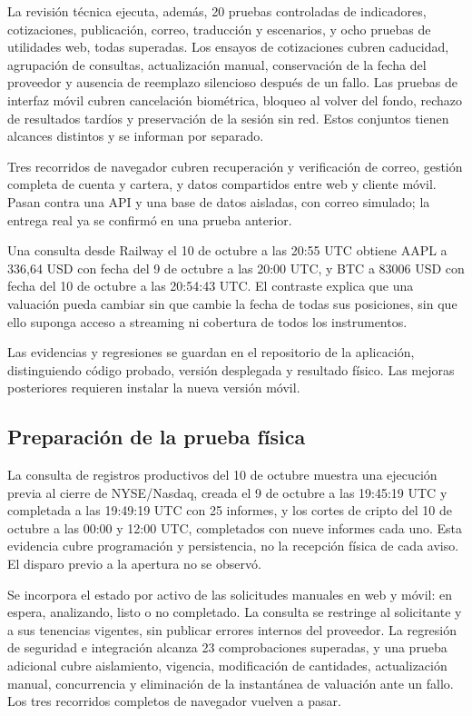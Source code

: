 La revisión técnica ejecuta, además, 20 pruebas controladas de indicadores, cotizaciones, publicación, correo, traducción y escenarios, y ocho pruebas de utilidades web, todas superadas. Los ensayos de cotizaciones cubren caducidad, agrupación de consultas, actualización manual, conservación de la fecha del proveedor y ausencia de reemplazo silencioso después de un fallo. Las pruebas de interfaz móvil cubren cancelación biométrica, bloqueo al volver del fondo, rechazo de resultados tardíos y preservación de la sesión sin red. Estos conjuntos tienen alcances distintos y se informan por separado.

Tres recorridos de navegador cubren recuperación y verificación de correo, gestión completa de cuenta y cartera, y datos compartidos entre web y cliente móvil. Pasan contra una API y una base de datos aisladas, con correo simulado; la entrega real ya se confirmó en una prueba anterior.

Una consulta desde Railway el 10 de octubre a las 20:55 UTC obtiene AAPL a 336,64 USD con fecha del 9 de octubre a las 20:00 UTC, y BTC a 83006 USD con fecha del 10 de octubre a las 20:54:43 UTC. El contraste explica que una valuación pueda cambiar sin que cambie la fecha de todas sus posiciones, sin que ello suponga acceso a streaming ni cobertura de todos los instrumentos.

Las evidencias y regresiones se guardan en el repositorio de la aplicación, distinguiendo código probado, versión desplegada y resultado físico. Las mejoras posteriores requieren instalar la nueva versión móvil.

\subsection{Preparación de la prueba física}\label{sec:preparacion-fisica}

La consulta de registros productivos del 10 de octubre muestra una ejecución previa al cierre de NYSE/Nasdaq, creada el 9 de octubre a las 19:45:19 UTC y completada a las 19:49:19 UTC con 25 informes, y los cortes de cripto del 10 de octubre a las 00:00 y 12:00 UTC, completados con nueve informes cada uno. Esta evidencia cubre programación y persistencia, no la recepción física de cada aviso. El disparo previo a la apertura no se observó.

Se incorpora el estado por activo de las solicitudes manuales en web y móvil: en espera, analizando, listo o no completado. La consulta se restringe al solicitante y a sus tenencias vigentes, sin publicar errores internos del proveedor. La regresión de seguridad e integración alcanza 23 comprobaciones superadas, y una prueba adicional cubre aislamiento, vigencia, modificación de cantidades, actualización manual, concurrencia y eliminación de la instantánea de valuación ante un fallo. Los tres recorridos completos de navegador vuelven a pasar.

